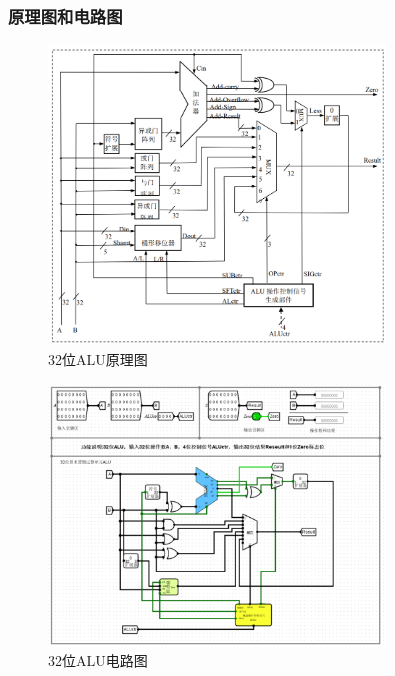 \documentclass{article}
\begin{document}
    \subsubsection{原理图和电路图}
    \begin{figure}[H]
    \centering
    \includegraphics[width=0.8\textwidth]{6.4.1.png}
    \caption{32位ALU原理图}
    \end{figure}

    \begin{figure}[H]
    \centering
    \includegraphics[width=0.8\textwidth]{6.4.2.png}
    \caption{32位ALU电路图}
    \end{figure}
\end{document}
